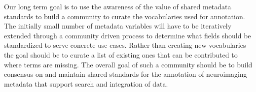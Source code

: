 \documentclass[../main.tex]{subfiles}
\begin{document}
Our long term goal is to use the awareness of the value of shared metadata standards to build a community to curate the vocabularies used for annotation. The initially small number of metadata variables will have to be iteratively extended through a community driven process to determine what fields should be standardized to serve concrete use cases. Rather than creating new vocabularies the goal should be to curate a list of existing ones that can be contributed to where terms are missing. The overall goal of such a community should be to build consensus on and maintain shared standards for the annotation of neuroimaging metadata that support search and integration of data.

\printbibliography
\end{document}
